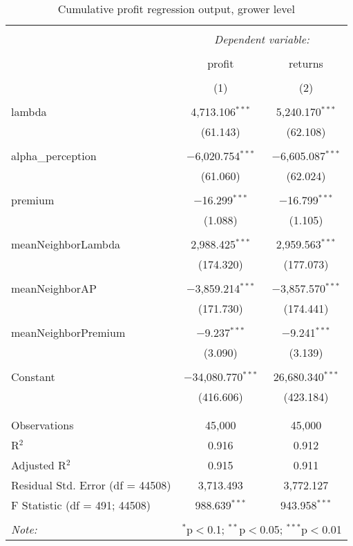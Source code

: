 
\begin{table}[!htbp] \centering 
  \caption{Cumulative profit regression output, grower level} 
  \label{Tab:InformationConfidence-CumulativeProfit-regtable} 
\begin{tabular}{@{\extracolsep{5pt}}lcc} 
\\[-1.8ex]\hline 
\hline \\[-1.8ex] 
 & \multicolumn{2}{c}{\textit{Dependent variable:}} \\ 
\cline{2-3} 
\\[-1.8ex] & profit & returns \\ 
\\[-1.8ex] & (1) & (2)\\ 
\hline \\[-1.8ex] 
 lambda & 4,713.106$^{***}$ & 5,240.170$^{***}$ \\ 
  & (61.143) & (62.108) \\ 
  & & \\ 
 alpha\_perception & $-$6,020.754$^{***}$ & $-$6,605.087$^{***}$ \\ 
  & (61.060) & (62.024) \\ 
  & & \\ 
 premium & $-$16.299$^{***}$ & $-$16.799$^{***}$ \\ 
  & (1.088) & (1.105) \\ 
  & & \\ 
 meanNeighborLambda & 2,988.425$^{***}$ & 2,959.563$^{***}$ \\ 
  & (174.320) & (177.073) \\ 
  & & \\ 
 meanNeighborAP & $-$3,859.214$^{***}$ & $-$3,857.570$^{***}$ \\ 
  & (171.730) & (174.441) \\ 
  & & \\ 
 meanNeighborPremium & $-$9.237$^{***}$ & $-$9.241$^{***}$ \\ 
  & (3.090) & (3.139) \\ 
  & & \\ 
 Constant & $-$34,080.770$^{***}$ & 26,680.340$^{***}$ \\ 
  & (416.606) & (423.184) \\ 
  & & \\ 
\hline \\[-1.8ex] 
Observations & 45,000 & 45,000 \\ 
R$^{2}$ & 0.916 & 0.912 \\ 
Adjusted R$^{2}$ & 0.915 & 0.911 \\ 
Residual Std. Error (df = 44508) & 3,713.493 & 3,772.127 \\ 
F Statistic (df = 491; 44508) & 988.639$^{***}$ & 943.958$^{***}$ \\ 
\hline 
\hline \\[-1.8ex] 
\textit{Note:}  & \multicolumn{2}{r}{$^{*}$p$<$0.1; $^{**}$p$<$0.05; $^{***}$p$<$0.01} \\ 
\end{tabular} 
\end{table} 
